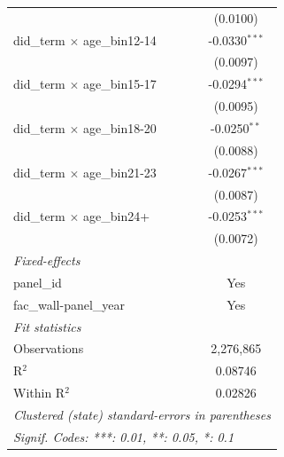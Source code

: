 \begin{tabular}{lc}
                                       & (0.0100)\\   
   did\_term $\times$ age\_bin12-14    & -0.0330$^{***}$\\   
                                       & (0.0097)\\   
   did\_term $\times$ age\_bin15-17    & -0.0294$^{***}$\\   
                                       & (0.0095)\\   
   did\_term $\times$ age\_bin18-20    & -0.0250$^{**}$\\   
                                       & (0.0088)\\   
   did\_term $\times$ age\_bin21-23    & -0.0267$^{***}$\\   
                                       & (0.0087)\\   
   did\_term $\times$ age\_bin24+      & -0.0253$^{***}$\\   
                                       & (0.0072)\\   
   \midrule
   \emph{Fixed-effects}\\
   panel\_id                           & Yes\\  
   fac\_wall-panel\_year               & Yes\\  
   \midrule
   \emph{Fit statistics}\\
   Observations                        & 2,276,865\\  
   R$^2$                               & 0.08746\\  
   Within R$^2$                        & 0.02826\\  
   \midrule \midrule
   \multicolumn{2}{l}{\emph{Clustered (state) standard-errors in parentheses}}\\
   \multicolumn{2}{l}{\emph{Signif. Codes: ***: 0.01, **: 0.05, *: 0.1}}\\
\end{tabular}
\par\endgroup


